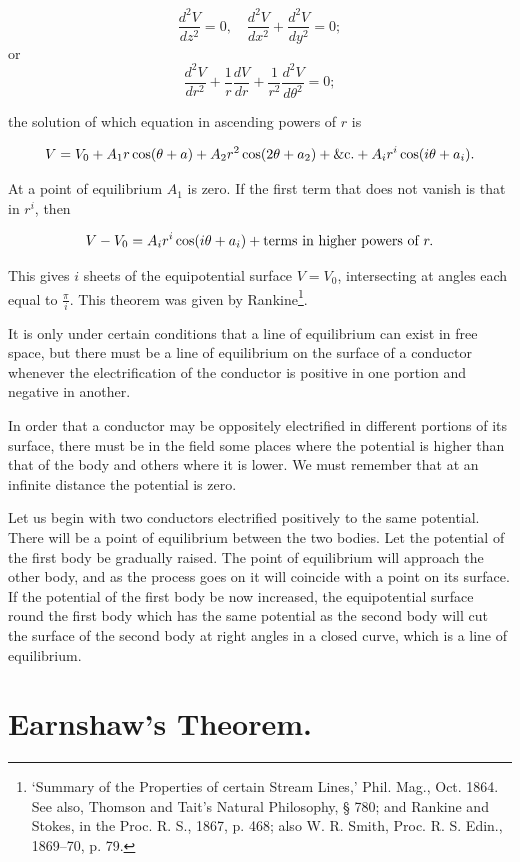 \documentclass[11pt,a4paper]{article}
\begin{document}
\[
\frac{d^2V}{dz^2} = 0, \quad \frac{d^2V}{dx^2} + \frac{d^2V}{dy^2} = 0;
\]
or
\[
\frac{d^2V}{dr^2} + \frac{1}{r}\frac{dV}{dr} + \frac{1}{r^2}\frac{d^2V}{d\theta^2} = 0;
\]

the solution of which equation in ascending powers of $r$ is

\[
V=V_0+A_1r\cos(\theta+a)+A_2r^2\cos(2\theta+a_2)+\hbox{\&c.}+A_ir^i\cos(i\theta+a_i).
\]

At a point of equilibrium $A_1$ is zero. If the first term that does not vanish is that in $r^i$, then

\[
V-V_0=A_ir^i\cos(i\theta+a_i)+\hbox{terms in higher powers of }r.
\]

This gives $i$ sheets of the equipotential surface $V=V_0$, intersecting at angles each equal to $\frac{\pi}{i}$. This theorem was given by Rankine\footnote[1]{`Summary of the Properties of certain Stream Lines,' Phil. Mag., Oct. 1864. See also, Thomson and Tait's Natural Philosophy, \S{} 780; and Rankine and Stokes, in the Proc. R. S., 1867, p. 468; also W. R. Smith, Proc. R. S. Edin., 1869--70, p. 79.}.

It is only under certain conditions that a line of equilibrium can exist in free space, but there must be a line of equilibrium on the surface of a conductor whenever the electrification of the conductor is positive in one portion and negative in another.

In order that a conductor may be oppositely electrified in different portions of its surface, there must be in the field some places where the potential is higher than that of the body and others where it is lower. We must remember that at an infinite distance the potential is zero.

Let us begin with two conductors electrified positively to the same potential. There will be a point of equilibrium between the two bodies. Let the potential of the first body be gradually raised. The point of equilibrium will approach the other body, and as the process goes on it will coincide with a point on its surface. If the potential of the first body be now increased, the equipotential surface round the first body which has the same potential as the second body will cut the surface of the second body at right angles in a closed curve, which is a line of equilibrium.

\section*{Earnshaw's Theorem.}
\end{document}
